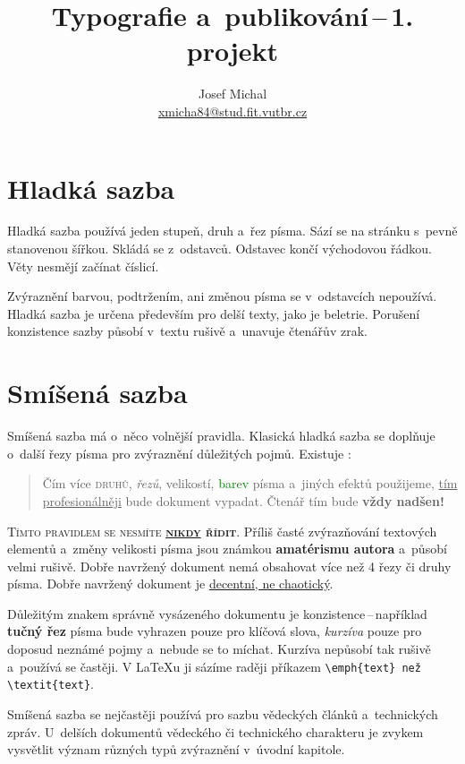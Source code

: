 \documentclass[twocolumn]{article}
\begin{document}
\title{Typografie a~publikování\,--\,1. projekt}
\author{Josef Michal

\href{mailto:xmicha84@stud.fit.vutbr.cz}{xmicha84@stud.fit.vutbr.cz}}
\date{}
\maketitle
\section{Hladká sazba}
Hladká sazba používá jeden stupeň, druh a~řez písma.
Sází se na stránku s~pevně stanovenou šířkou.
Skládá se z~odstavců. Odstavec končí východovou řádkou.
Věty nesmějí začínat číslicí.

Zvýraznění barvou, podtržením, ani změnou písma se v~odstavcích nepoužívá.
Hladká sazba je určena především pro delší texty, jako je beletrie.
Porušení konzistence sazby působí v~textu rušivě a~unavuje čtenářův zrak.
\section{Smíšená sazba}
Smíšená sazba má o~něco volnější pravidla.
Klasická hladká sazba se doplňuje o~další řezy písma pro zvýraznění důležitých pojmů.
Existuje :
    
\begin{quote}
{Čím více \textsc{druhů}, \emph{řezů}, \scriptsize velikostí\normalsize, \textcolor{green}{barev} písma a~jiných efektů použijeme, \underline{tím profesionálněji} bude {\selectfont dokument} vypadat.
Čtenář tím bude \LARGE \textbf{vždy nadšen!}}
\end{quote}

\textsc{Tímto pravidlem se nesmíte \bfseries\underline{nikdy} řídit}\mdseries.
Příliš časté zvýrazňování textových elementů a~změny \mbox{\tiny velikosti} písma jsou známkou \textbf{amatérismu autora} a~působí velmi rušivě.
Dobře navržený dokument nemá obsahovat více než 4 řezy či druhy písma.
Dobře navržený dokument je \underline{decentní, ne chaotický}.

Důležitým znakem správně vysázeného dokumentu je konzistence\,--\,například \textbf{tučný řez} písma bude vyhrazen pouze pro klíčová slova, \emph{kurzíva} pouze pro doposud neznámé pojmy a~nebude se to míchat.
Kurzíva nepůsobí tak rušivě a~používá se častěji.
V \LaTeX u ji sázíme raději příkazem \verb|\emph{text} než \textit{text}|.

Smíšená sazba se nejčastěji používá pro sazbu vědeckých článků a~technických zpráv.
U~delších dokumentů vědeckého či technického charakteru je zvykem vysvětlit význam různých typů zvýraznění v~úvodní kapitole.
\end{document}
